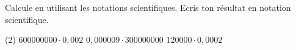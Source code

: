 %
%
Calcule en utilisant les notations scientifiques. Ecris ton résultat en notation scientifique.
	\begin{tasks}(2)
		\task $600000000\cdot 0,002$
		\task $0,000009\cdot 300000000$
		\task $120000\cdot 0,0002$
	\end{tasks}
